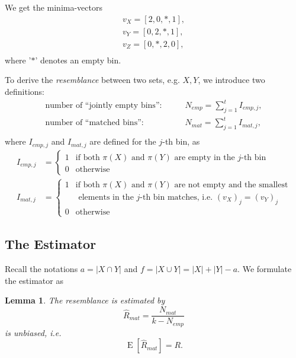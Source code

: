 \documentclass[a4paper]{article}
\DeclareMathOperator{\E}{E}
\newtheorem{mylemma}{Lemma}
\begin{document}
We get the minima-vectors
\begin{equation}
\begin{split}
v_X=[2,0,*,1],\\
v_Y=[0,2,*,1],\\
v_Z=[0,*,2,0],\\
\end{split}
\end{equation}
where '$*$' denotes an empty bin.

To derive the \emph{resemblance} between two sets, e.g. $X,Y$, we introduce two definitions:
\begin{equation} \label{eq:defEmpjMatj}
\begin{split}
\text{number of ``jointly empty bins'':} \qquad & N_{emp}=\sum_{j=1}^t I_{emp,j}, \\
\text{number of ``matched bins'':} \qquad & N_{mat}=\sum_{j=1}^t I_{mat,j},\\
\end{split}
\end{equation}
where $I_{emp,j}$ and $I_{mat,j}$ are defined for the $j$-th bin, as
\begin{equation} \label{eq:defEmpMat}
\begin{split}
  I_{emp,j} &=\begin{cases}
    1 & \text{if both $\pi(X)$ and $\pi(Y)$ are empty in the $j$-th bin} \\
    0 & \text{otherwise}
  \end{cases}\\
  I_{mat,j} &=\begin{cases}
    1 & \text{if both $\pi(X)$ and $\pi(Y)$ are not empty and the smallest} \\
      & \text { elements in the $j$-th bin matches, i.e. $(v_X)_j=(v_Y)_j$} \\
    0 & \text{otherwise}
  \end{cases}
\end{split}
\end{equation}


\subsection{The Estimator}

Recall the notations $a=|X \cap Y|$ and $f=|X \cup Y|=|X|+|Y|-a$. We formulate the estimator as 
\begin{framed}
\begin{mylemma} \label{lem:onePermutationHashing}
The \emph{resemblance} is estimated by
\begin{equation}
\hat{R}_{mat}=\frac{N_{mat}}{k-N_{emp}}
\end{equation}
is unbiased, i.e.
\begin{equation}
\E\left[\hat{R}_{mat}\right]=R.
\end{equation}
\end{mylemma}
\end{framed}
\end{document}
